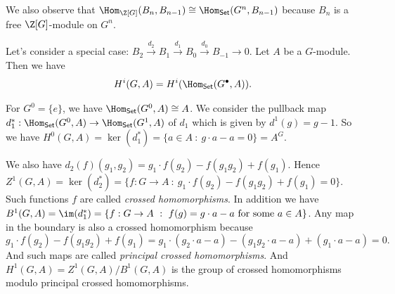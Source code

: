 We also observe that $\Hom_{\Z[G]}(B_n, B_{n-1}) \cong \Hom_{\mathsf{Set}}(G^n, B_{n-1})$
because $B_n$ is a free $\Z[G]$-module on $G^n$.

Let's consider a special case: $B_2 \xrightarrow{d_2} B_1 \xrightarrow{d_1} B_0 \xrightarrow{d_0} B_{-1} \to 0$.
Let $A$ be a $G$-module.
Then we have 
\begin{align*}
    H^i(G, A) = H^i(\Hom_{\mathsf{Set}}(G^\bullet, A)).
\end{align*}

For $G^0 = \{e\}$, we have $\Hom_{\mathsf{Set}}(G^0, A) \cong A$.
We consider the pullback map $d_1^*: \Hom_{\mathsf{Set}}(G^0, A) \to \Hom_{\mathsf{Set}}(G^1, A)$
of $d_1$ which is given by $d^1(g) = g-1$.
So we have $H^0(G, A) = \ker(d_1^*) = \{a \in A \ : \ g\cdot a - a = 0 \} = A^G$.

We also have $d_2(f)(g_1, g_2) = g_1\cdot f(g_2) - f(g_1g_2) + f(g_1)$.
Hence $Z^1(G, A) = \ker(d_2^*) = \{f: G \to A \ : \ g_1\cdot f(g_2) - f(g_1g_2) + f(g_1) = 0\}$.
Such functions $f$ are called \textit{crossed homomorphisms}.
In addition we have $B^1(G, A) = \im(d_1^*) = \{f: G \to A \ : \ f(g) = g\cdot a - a \text{ for some } a \in A\}$.
Any map in the boundary is also a crossed homomorphism because
\[
    g_1\cdot f(g_2) - f(g_1g_2) + f(g_1) = g_1\cdot (g_2\cdot a - a) - (g_1g_2\cdot a - a) + (g_1\cdot a - a) = 0.
\]
And such maps are called \textit{principal crossed homomorphisms}.
And $H^1(G, A) = Z^1(G, A) / B^1(G, A)$ is the group of crossed homomorphisms modulo principal crossed homomorphisms.